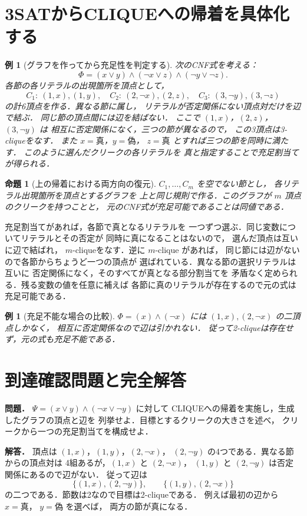 \documentclass[a5paper,10pt,onecolumn]{jsarticle}
\makeatletter
\theoremstyle{mathnotetheorem}
\newtheorem{proposition}[theorem]{命題}
\newtheorem{example}[theorem]{例}
\renewcommand{\proofname}{証明}
\renewenvironment{proof}[1][\proofname]{%
  \par\pushQED{\qed}\normalfont\topsep4\p@\@plus2\p@\relax
  \trivlist\item[\hskip\labelsep\bfseries #1]\ignorespaces
}{\popQED\endtrivlist\@endpefalse}
\makeatother
\begin{document}
\section{3SATからCLIQUEへの帰着を具体化する}
\begin{example}[グラフを作ってから充足性を判定する]\label{ex:sat-to-clique}
次のCNF式を考える：
\[
 \Phi=(x\vee y)\wedge(\neg x\vee z)
       \wedge(\neg y\vee\neg z).
\]
各節の各リテラルの出現箇所を頂点として，
\[
 C_1:\ (1,x),(1,y),\quad
 C_2:\ (2,\neg x),(2,z),\quad
 C_3:\ (3,\neg y),(3,\neg z)
\]
の計6頂点を作る．異なる節に属し，
リテラルが否定関係にない頂点対だけを辺で結ぶ．
同じ節の頂点間には辺を結ばない．
ここで $(1,x)$，$(2,z)$，$(3,\neg y)$ は
相互に否定関係になく，三つの節が異なるので，
この3頂点は3-cliqueをなす．
また $x=\mathrm{真}$，$y=\mathrm{偽}$，
$z=\mathrm{真}$ とすれば三つの節を同時に満たす．
このように選んだクリークの各リテラルを
真と指定することで充足割当てが得られる．
\end{example}
\begin{proposition}[上の帰着における両方向の復元]
$C_1,\ldots,C_m$ を空でない節とし，
各リテラル出現箇所を頂点とするグラフを
上と同じ規則で作る．このグラフが
$m$ 頂点のクリークを持つことと，
元のCNF式が充足可能であることは同値である．
\end{proposition}
\begin{proof}
充足割当てがあれば，各節で真となるリテラルを
一つずつ選ぶ．同じ変数についてリテラルとその否定が
同時に真になることはないので，
選んだ頂点は互いに辺で結ばれ，
$m$-cliqueをなす．逆に $m$-clique があれば，
同じ節には辺がないので各節からちょうど一つの頂点が
選ばれている．異なる節の選択リテラルは互いに
否定関係になく，そのすべてが真となる部分割当てを
矛盾なく定められる．残る変数の値を任意に補えば
各節に真のリテラルが存在するので元の式は充足可能である．
\end{proof}
\begin{example}[充足不能な場合の比較]
$\Phi=(x)\wedge(\neg x)$ には
$(1,x),(2,\neg x)$ の二頂点しかなく，
相互に否定関係なので辺は引かれない．
従って2-cliqueは存在せず，元の式も充足不能である．
\end{example}

\section*{到達確認問題と完全解答}
\noindent\textbf{問題．}
$\Psi=(x\vee y)\wedge(\neg x\vee\neg y)$ に対して
CLIQUEへの帰着を実施し，生成したグラフの頂点と辺を
列挙せよ．目標とするクリークの大きさを述べ，
クリークから一つの充足割当てを構成せよ．

\medskip\noindent\textbf{解答．}
頂点は
$(1,x)$，$(1,y)$，$(2,\neg x)$，
$(2,\neg y)$ の4つである．異なる節からの頂点対は
4組あるが，$(1,x)$ と $(2,\neg x)$，
$(1,y)$ と $(2,\neg y)$ は否定関係にあるので辺がない．
従って辺は
\[
 \{(1,x),(2,\neg y)\},\qquad
 \{(1,y),(2,\neg x)\}
\]
の二つである．節数は2なので目標は2-cliqueである．
例えば最初の辺から $x=\mathrm{真}$，
$y=\mathrm{偽}$ を選べば，
両方の節が真になる．
\end{document}
